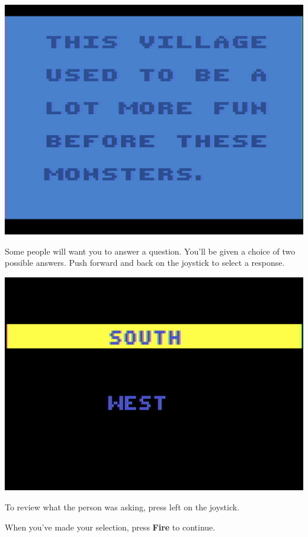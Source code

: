 \documentclass[10pt,twocolumn,openany,article]{memoir}
\begin{document}
\begin{center}
  \includegraphics[width=\columnwidth]{../Manual/TextNTSC.png}
\end{center}

Some people will want you to answer a question. You'll be given a choice
of two possible answers. Push forward and back on the joystick to select
a response.

\begin{center}
  \includegraphics[width=\columnwidth]{../Manual/InquireNTSC.png}
\end{center}

To review  what  the  person  was  asking, press  left  on
the joystick.

When you've made your selection, press \textbf{Fire} to continue.
\end{document}
